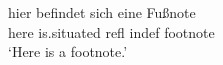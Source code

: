 \ea
\gll  hier{\footnotemark} befindet sich eine Fu{\ss}note\\
      here is.situated refl indef footnote\\
\glt `Here is a footnote.'
\z
{}